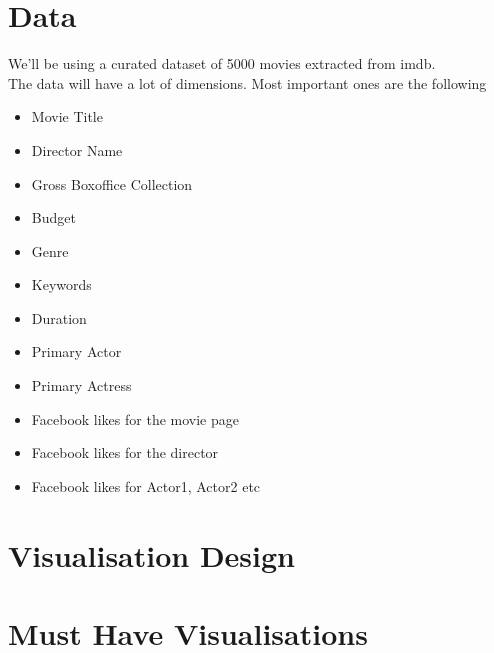 \documentclass{report}
\begin{document}
\section{Data}
We'll be using a curated dataset of 5000 movies extracted from imdb. \\
The data will have a lot of dimensions. Most important ones are the following
\begin{itemize}
\item Movie Title
\item Director Name
\item Gross Boxoffice Collection
\item Budget
\item Genre
\item Keywords
\item Duration
\item Primary Actor
\item Primary Actress
\item Facebook likes for the movie page
\item Facebook likes for the director
\item Facebook likes for Actor1, Actor2 etc
\end{itemize}
\section{Visualisation Design}
\section{Must Have Visualisations}
\end{document}

